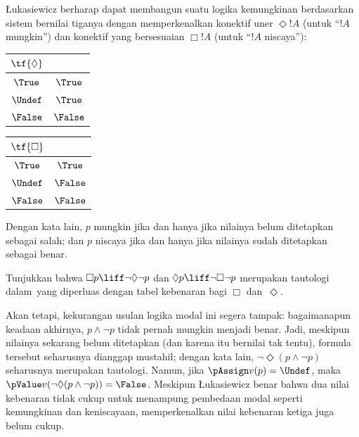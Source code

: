 \documentclass[../../../include/open-logic-section]{subfiles}
\begin{document}
\L ukasiewicz berharap dapat membangun suatu logika kemungkinan berdasarkan
sistem bernilai tiganya dengan memperkenalkan konektif uner
$\Diamond !A$ (untuk ``$!A$ mungkin'') dan konektif yang bersesuaian
$\Box !A$ (untuk ``$!A$ niscaya''):
\begin{center}
  \begin{tabular}{c|c}
    $\tf{\Diamond}$ & \\
    \hline
    $\True$ & $\True$ \\
    $\Undef$ & $\True$ \\
    $\False$ & $\False$
  \end{tabular}
  \quad
  \begin{tabular}{c|c}
    $\tf{\Box}$ & \\
    \hline
    $\True$ & $\True$ \\
    $\Undef$ & $\False$ \\
    $\False$ & $\False$
  \end{tabular}
\end{center}
Dengan kata lain, $p$ mungkin jika dan hanya jika nilainya belum ditetapkan
sebagai salah; dan $p$ niscaya jika dan hanya jika nilainya sudah ditetapkan
sebagai benar.

\begin{prob}
  Tunjukkan bahwa $\Box p\liff\lnot\Diamond\lnot p$ dan
  $\Diamond p\liff\lnot\Box\lnot p$ merupakan tautologi dalam~\LogLuk[3]
  yang diperluas dengan tabel kebenaran bagi $\Box$ dan~$\Diamond$.
\end{prob}

Akan tetapi, kekurangan usulan logika modal ini segera tampak: bagaimanapun
keadaan akhirnya, $p\land\lnot p$ tidak pernah mungkin menjadi benar. Jadi,
meskipun nilainya sekarang belum ditetapkan (dan karena itu bernilai tak tentu),
formula tersebut seharusnya dianggap mustahil; dengan kata lain,
$\lnot\Diamond(p\land\lnot p)$ seharusnya merupakan tautologi. Namun, jika
$\pAssign v(p)=\Undef$, maka
$\pValue v(\lnot\Diamond(p\land\lnot p))=\False$. Meskipun \L ukasiewicz
benar bahwa dua nilai kebenaran tidak cukup untuk menampung pembedaan modal
seperti kemungkinan dan keniscayaan, memperkenalkan nilai kebenaran ketiga
juga belum cukup.
\end{document}
